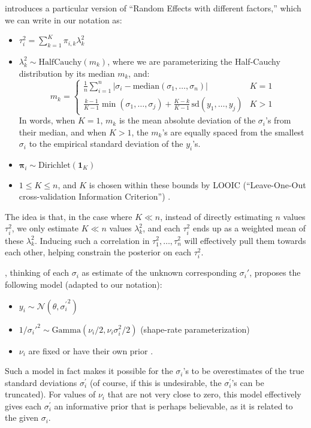 \documentclass[letterpaper,12pt]{article}
\begin{document}
\citet[sec. 5.1]{merkatas2019shades} introduces a particular version of ``Random Effects with different factors,'' which we can write in our notation as:
\begin{itemize}
  \item $\tau_i^2=\sum_{k=1}^K\pi_{i,k}\lambda^2_k$
  \item $\lambda^2_k\sim\mathrm{HalfCauchy}(m_k)$, where we are parameterizing the Half-Cauchy distribution by its median $m_k$, and:
  \[
  m_k=\begin{cases}
    \frac{1}{n}\sum_{i=1}^n|\sigma_i-\mathrm{median}(\sigma_1,\ldots,\sigma_n)| & K=1\\
    \frac{k-1}{K-1}\min(\sigma_1,\ldots,\sigma_j)+\frac{K-k}{K-1}\,\mathrm{sd}(y_1,\ldots,y_j) & K>1
    \end{cases}
  \]
  In words, when $K=1$, $m_k$ is the mean absolute deviation of the $\sigma_i$'s from their median, and when $K>1$, the $m_k$'s are equally spaced from the smallest $\sigma_i$ to the empirical standard deviation of the $y_i$'s.
  \item $\bm{\pi}_{i}\sim\mathrm{Dirichlet}(\bm{1}_K)$
  \item $1\leq K\leq n$, and $K$ is chosen within these bounds by LOOIC (``Leave-One-Out cross-validation Information Criterion'') \citep[sec. 5.2]{merkatas2019shades}.
\end{itemize}
The idea is that, in the case where $K\ll n$, instead of directly estimating $n$ values $\tau_i^2$, we only estimate $K\ll n$ values $\lambda_k^2$, and each $\tau_i^2$ ends up as a weighted mean of these $\lambda_k^2$. Inducing such a correlation in $\tau_1^2,\ldots,\tau_n^2$ will effectively pull them towards each other, helping constrain the posterior on each $\tau_i^2$.

\citet{forbes2016hierarchical}, thinking of each $\sigma_i$ as estimate of the unknown corresponding $\sigma_i'$, proposes the following model (adapted to our notation):
\begin{itemize}
  \item $y_i\sim \mathcal{N}(\theta,{\sigma_i^\prime}^2)$
  \item $1/\sigma_i'^2\sim\mathrm{Gamma}(\nu_i/2,\nu_i\sigma^2_i/2)$ (shape-rate parameterization)
  \item $\nu_i$ are fixed or have their own prior \citep[sec. 3.1, 3.3]{forbes2016hierarchical}.
\end{itemize}
Such a model in fact makes it possible for the $\sigma_i$'s to be overestimates of the true standard deviations $\sigma_i^\prime$ (of course, if this is undesirable, the $\sigma_i^\prime$'s can be truncated). For values of $\nu_i$ that are not very close to zero, this model effectively gives each $\sigma_i^\prime$ an informative prior that is perhaps believable, as it is related to the given $\sigma_i$.
\end{document}
